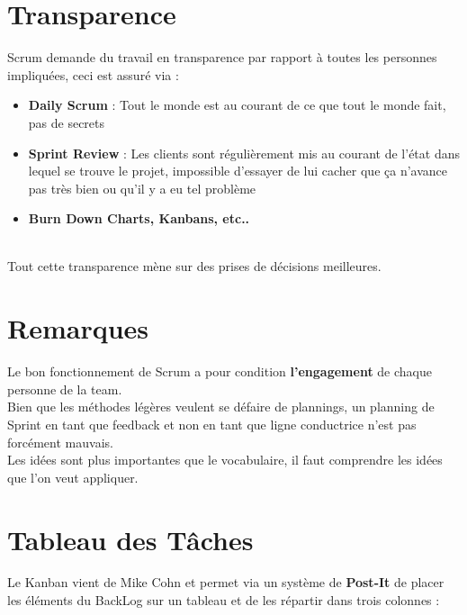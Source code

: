 \documentclass{report}
\begin{document}
	\section{Transparence}

		Scrum demande du travail en transparence par rapport à toutes les personnes impliquées, ceci est assuré via : \\ 

		\begin{itemize}
			\item \textbf{Daily Scrum} : Tout le monde est au courant de ce que tout le monde fait, pas de secrets
			\item \textbf{Sprint Review} : Les clients sont régulièrement mis au courant de l'état dans lequel se trouve le projet, impossible d'essayer de lui cacher que ça n'avance pas très bien ou qu'il y a eu tel problème
			\item \textbf{Burn Down Charts, Kanbans, etc..}
		\end{itemize}\\

		Tout cette transparence mène sur des prises de décisions meilleures.\\

	\section{Remarques}

		Le bon fonctionnement de Scrum a pour condition \textbf{l'engagement} de chaque personne de la team.\\

		Bien que les méthodes légères veulent se défaire de plannings, un planning de Sprint en tant que feedback et non en tant que ligne conductrice n'est pas forcément mauvais.\\

		Les idées sont plus importantes que le vocabulaire, il faut comprendre les idées que l'on veut appliquer.\\

	\section{Tableau des Tâches}

		Le Kanban vient de Mike Cohn et permet via un système de \textbf{Post-It} de placer les éléments du BackLog sur un tableau et de les répartir dans trois colonnes : \\
\end{document}
